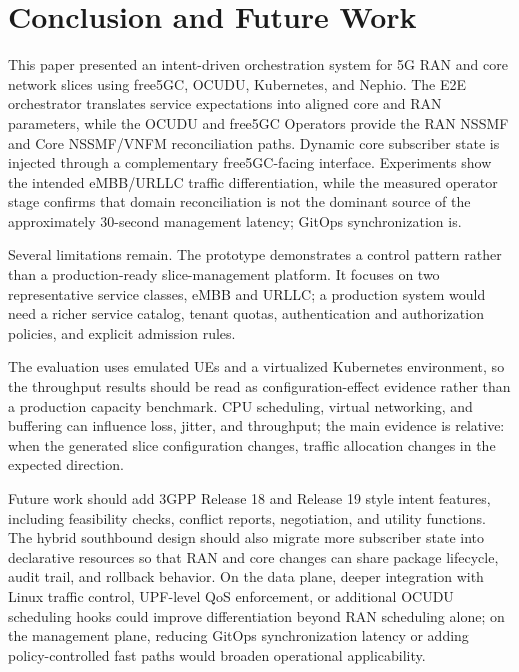 \section{Conclusion and Future Work}
\label{sec:conclusion}

This paper presented an intent-driven orchestration system for 5G RAN and core network slices using free5GC, OCUDU, Kubernetes, and Nephio. The E2E orchestrator translates service expectations into aligned core and RAN parameters, while the OCUDU and free5GC Operators provide the RAN NSSMF and Core NSSMF/VNFM reconciliation paths. Dynamic core subscriber state is injected through a complementary free5GC-facing interface. Experiments show the intended eMBB/URLLC traffic differentiation, while the measured operator stage confirms that domain reconciliation is not the dominant source of the approximately 30-second management latency; GitOps synchronization is.

Several limitations remain. The prototype demonstrates a control pattern rather than a production-ready slice-management platform. It focuses on two representative service classes, eMBB and URLLC; a production system would need a richer service catalog, tenant quotas, authentication and authorization policies, and explicit admission rules.

The evaluation uses emulated UEs and a virtualized Kubernetes environment, so the throughput results should be read as configuration-effect evidence rather than a production capacity benchmark. CPU scheduling, virtual networking, and buffering can influence loss, jitter, and throughput; the main evidence is relative: when the generated slice configuration changes, traffic allocation changes in the expected direction.

Future work should add 3GPP Release 18 and Release 19 style intent features, including feasibility checks, conflict reports, negotiation, and utility functions. The hybrid southbound design should also migrate more subscriber state into declarative resources so that RAN and core changes can share package lifecycle, audit trail, and rollback behavior. On the data plane, deeper integration with Linux traffic control, UPF-level QoS enforcement, or additional OCUDU scheduling hooks could improve differentiation beyond RAN scheduling alone; on the management plane, reducing GitOps synchronization latency or adding policy-controlled fast paths would broaden operational applicability.
